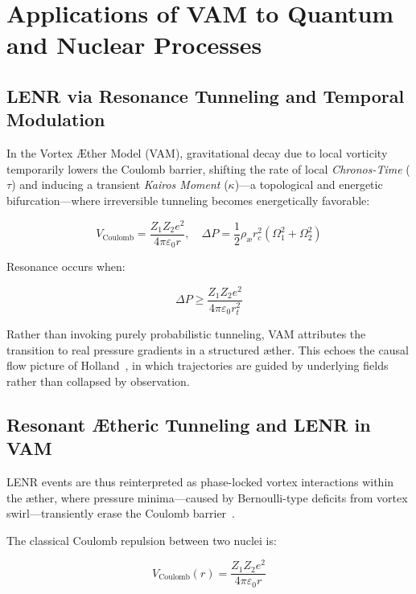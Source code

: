 \section{Applications of VAM to Quantum and Nuclear Processes}
\label{sec:LENR_QED}

\subsection*{LENR via Resonance Tunneling and Temporal Modulation}

In the Vortex Æther Model (VAM), gravitational decay due to local vorticity temporarily lowers the Coulomb barrier, shifting the rate of local \emph{Chronos-Time} (\(\tau\)) and inducing a transient \emph{Kairos Moment} (\(\kappa\))—a topological and energetic bifurcation—where irreversible tunneling becomes energetically favorable:

\begin{equation}
    V_\text{Coulomb} = \frac{Z_1 Z_2 e^2}{4\pi \varepsilon_0 r}, \quad
    \Delta P = \frac{1}{2} \rho_\text{\ae} r_c^2 (\Omega_1^2 + \Omega_2^2)
\end{equation}

Resonance occurs when:

\begin{equation}
    \Delta P \geq \frac{Z_1 Z_2 e^2}{4\pi \varepsilon_0 r_t^2}
\end{equation}

Rather than invoking purely probabilistic tunneling, VAM attributes the transition to real pressure gradients in a structured æther. This echoes the causal flow picture of Holland~\cite{holland1993quantum}, in which trajectories are guided by underlying fields rather than collapsed by observation.

\subsection*{Resonant Ætheric Tunneling and LENR in VAM}

LENR events are thus reinterpreted as phase-locked vortex interactions within the æther, where pressure minima—caused by Bernoulli-type deficits from vortex swirl—transiently erase the Coulomb barrier~\cite{Barcelo2011, volovik2003}.

The classical Coulomb repulsion between two nuclei is:

\begin{equation}
    V_\text{Coulomb}(r) = \frac{Z_1 Z_2 e^2}{4\pi \varepsilon_0 r}
\end{equation}

